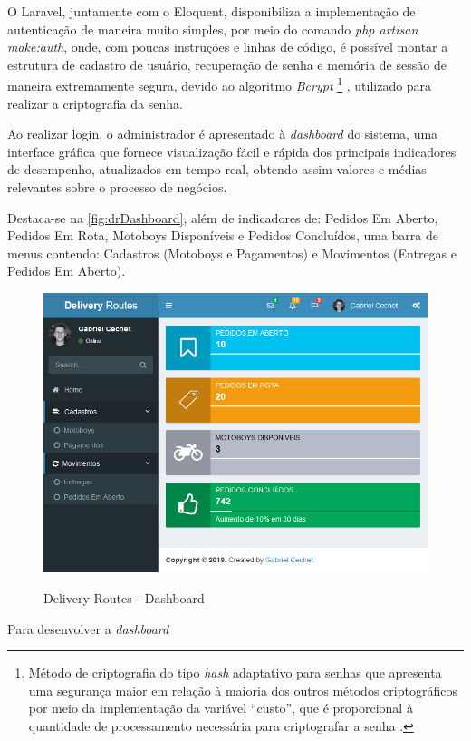 O Laravel, juntamente com o Eloquent, disponibiliza a implementação de autenticação de maneira muito simples, por meio do comando \textit{php artisan make:auth}, onde, com poucas instruções e linhas de código, é possível montar a estrutura de cadastro de usuário, recuperação de senha e memória de sessão de maneira extremamente segura, devido ao algoritmo \textit{Bcrypt}
\footnote{Método de criptografia do tipo \textit{hash} adaptativo para senhas que apresenta uma segurança maior em relação à maioria dos outros métodos criptográficos por meio da implementação da variável “custo”, que é proporcional à quantidade de processamento necessária para criptografar a senha \cite{bcrypt}.}
, utilizado para realizar a criptografia da senha.

Ao realizar login, o administrador é apresentado à \textit{dashboard} do sistema, uma interface gráfica que fornece visualização fácil e rápida dos principais indicadores de desempenho, atualizados em tempo real, obtendo assim valores e médias relevantes sobre o processo de negócios. 

Destaca-se na \autoref{fig:drDashboard}, além de indicadores de: Pedidos Em Aberto, Pedidos Em Rota, Motoboys Disponíveis e Pedidos Concluídos, uma barra de menus contendo: Cadastros (Motoboys e Pagamentos) e Movimentos (Entregas e Pedidos Em Aberto).

\begin{figure}[H]
    \centering
    \caption{Delivery Routes - Dashboard}
    \includegraphics[width=1.0\textwidth]{./dados/figuras/fig13}
    \label{fig:drDashboard}
\end{figure}

\newpage
Para desenvolver a \textit{dashboard}
